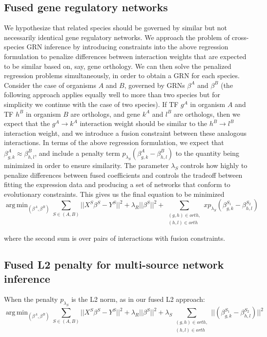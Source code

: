 \documentclass[11pt]{article}
\DeclareMathOperator*{\argmin}{arg\,min}
\begin{document}
\subsection{Fused gene regulatory networks}
We hypothesize that related species should be governed by similar but not necessarily identical gene regulatory networks. We approach the problem of cross-species GRN inference by introducing constraints into the above regression formulation to penalize differences between interaction weights that are expected to be similar based on, say, gene orthology. We can then solve the penalized regression problems simultaneously, in order to obtain a GRN for each species. Consider the case of organisms $A$ and $B$, governed by GRNs $\beta^A$ and $\beta^B$ (the following approach applies equally well to more than two species but for simplicity we continue with the case of two species). If TF $g^A$ in organism $A$ and TF $h^B$ in organism $B$ are orthologs, and gene $k^A$ and $l^B$ are orthologs, then we expect that the $g^A \rightarrow k^A$ interaction weight should be similar to the $h^B \rightarrow l^B$ interaction weight, and we introduce a fusion constraint between these analogous interactions. In terms of the above regression formulation, we expect that $\beta^A_{g,k} \approx \beta^B_{h,l}$, and include a penalty term $p_{\lambda_S}(\beta^A_{g,k} - \beta^B_{h,l})$ to the quantity being minimized in order to ensure similarity. The parameter $\lambda_S$ controls how highly to penalize differences between fused coefficients and controls the tradeoff between fitting the expression data and producing a set of networks that conform to evolutionary constraints. This gives us the final equation to be minimized 
\begin{equation}
\argmin_{(\beta^A, \beta^B)} \displaystyle\sum_{S \in (A, B)} \vert \vert X^S\beta^S - Y^S \vert \vert ^2 + \lambda_R \vert \vert \beta^S \vert \vert ^2 + \displaystyle \sum_{\substack{(g,h) \in orth,\\
 (h,l) \in orth}}x p_{\lambda_S}(\beta^{S_1}_{g,k} - \beta^{S_2}_{h,l})
\end{equation}

where the second sum is over pairs of interactions with fusion constraints. 


\subsection{Fused L2 penalty for multi-source network inference}
When the penalty $p_{\lambda_S}$ is the L2 norm, as in our fused L2 approach:
\begin{equation}
\argmin_{(\beta^A, \beta^B)} \displaystyle\sum_{S \in (A, B)} \vert \vert X^S\beta^S - Y^S \vert \vert ^2 + \lambda_R \vert \vert \beta^S \vert \vert ^2 + \displaystyle \lambda_S \sum_{\substack{(g,h) \in orth,\\
 (h,l) \in orth}} \vert \vert (\beta^{S_1}_{g,k} - \beta^{S_2}_{h,l}) \vert \vert ^2
\end{equation}
\end{document}
